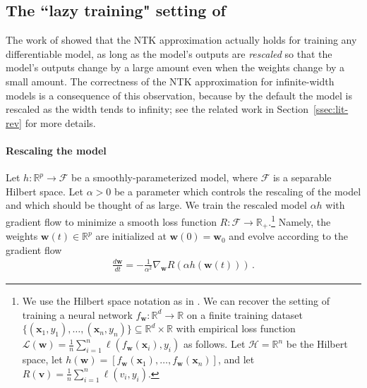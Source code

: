 \documentclass[11pt]{article} %
\newcommand{\R}{\mathbb{R}}
\newcommand{\<}{\langle}
\renewcommand{\>}{\rangle}
\def\bv{{\boldsymbol v}}
\def\bw{{\boldsymbol w}}
\def\bx{{\boldsymbol x}}
\def\cL{{\mathcal L}}
\def\cF{{\mathcal F}}
\def\cH{{\mathcal H}}
\def\cF{{\mathcal F}}
\newcommand{\dd}[2]{\frac{d #1}{d #2}}
\theoremstyle{plain}
\theoremstyle{definition}
\theoremstyle{remark}
\begin{document}
 







\subsection{The ``lazy training" setting of \cite{chizat2019lazy}}
The work of \cite{chizat2019lazy} showed that the NTK approximation actually holds for training any differentiable model, as long as the model's outputs are \textit{rescaled} so that the model's outputs change by a large amount even when the weights change by a small amount. The correctness of the NTK approximation for infinite-width models is a consequence of this observation, because by the default the model is rescaled as the width tends to infinity; see the related work in Section~\ref{ssec:lit-rev} for more details.

\paragraph{Rescaling the model} Let $h : \R^p \to \cF$ be a smoothly-parameterized model, where $\cF$ is a separable Hilbert space. Let $\alpha > 0$ be a parameter which controls the rescaling of the model and which should be thought of as large. We train the rescaled model $\alpha h$ with gradient flow to minimize a smooth loss function $R : \cF \to \R_+$.\footnote{We use the Hilbert space notation as in \cite{chizat2019lazy}. We can recover the setting of training a neural network $f_{\bw} : \R^d \to \R$ on a finite training dataset $\{(\bx_1,y_1),\ldots,(\bx_n,y_n)\} \subseteq \R^d \times \R$ with empirical loss function $\cL(\bw) = \frac{1}{n} \sum_{i=1}^n \ell(f_{\bw}(\bx_i),y_i)$ as follows. Let $\cH = \R^n$ be the Hilbert space, let $h(\bw) = [f_{\bw}(\bx_1),\ldots, f_{\bw}(\bx_n)]$,  and let $R(\bv) = \frac{1}{n} \sum_{i=1}^n \ell(v_i, y_i)$.} Namely, the weights $\bw(t) \in \R^p$ are initialized at $\bw(0) = \bw_0$ and evolve according to the gradient flow 
\begin{align}\label{eq:grad-flow}
\dd{\bw}{t} = -\frac{1}{\alpha^2} \nabla_{\bw} R(\alpha h(\bw(t)))\,.
\end{align}
\end{document}
